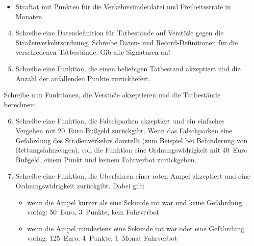 \begin{aufgabe}
\begin{itemize}
  \item Straftat mit Punkten für die Verkehrssünderdatei und
    Freiheitsstrafe in Monaten
  \end{itemize}
  
  \begin{enumerate} \setcounter{enumii}{3}
  \item Schreibe eine Datendefinition für
    Tatbestände auf Verstöße gegen die Straßenverkehrsordnung.
    Schreibe Daten- und Record-Definitionen für die verschiedenen
    Tatbestände.  Gib alle Signaturen an!

  \item Schreibe eine Funktion, die einen
    beliebigen Tatbestand akzeptiert und die Anzahl der anfallenden
    Punkte zurückliefert.
  \end{enumerate}

  Schreibe nun Funktionen, die Verstöße akzeptieren und die
  Tatbestände berechnen:

  \begin{enumerate} \setcounter{enumii}{5}
  \item Schreibe eine Funktion, die Falschparken
    akzeptiert und ein einfaches Vergehen mit 20~Euro Bußgeld zurückgibt.
    Wenn das Falschparken eine Gefährdung des Straßenverkehrs
    darstellt (zum Beispiel bei Behinderung von Rettungsfahrzeugen),
    soll die Funktion eine Ordnungswidrigkeit mit 40~Euro Bußgeld,
    einem Punkt und keinem Fahrverbot zurückgeben.

  \item Schreibe eine Funktion, die Überfahren
    einer roten Ampel akzeptiert und eine Ordnungswidrigkeit
    zurückgibt.  Dabei gilt:
    \begin{itemize}
    \item wenn die Ampel kürzer als eine Sekunde rot war und keine
      Gefährdung vorlag: 50~Euro, 3~Punkte, kein Fahrverbot
    \item wenn die Ampel mindestens eine Sekunde rot war oder eine
      Gefährdung vorlag: 125~Euro, 4~Punkte, 1~Monat Fahrverbot
    \end{itemize}


\end{enumerate}
\end{aufgabe}
